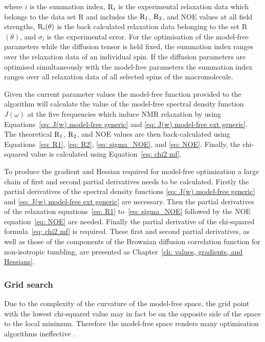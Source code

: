 \noindent where $i$ is the summation index, $\mathrm{R}_i$ is the experimental relaxation data which belongs to the data set R and includes the $\mathrm{R}_1$, $\mathrm{R}_2$, and NOE values at all field strengths, $\mathrm{R}_i(\theta)$ is the back calculated relaxation data belonging to the set R$(\theta)$, and $\sigma_i$ is the experimental error.
For the optimisation of the model-free parameters while the diffusion tensor is held fixed, the summation index ranges over the relaxation data of an individual spin.
If the diffusion parameters are optimised simultaneously with the model-free parameters the summation index ranges over all relaxation data of all selected spins of the macromolecule.

Given the current parameter values the model-free function provided to the algorithm will calculate the value of the model-free spectral density function $J(\omega)$ at the five frequencies which induce NMR relaxation by using Equations~\eqref{eq: J(w) model-free generic} and \eqref{eq: J(w) model-free ext generic}.
The theoretical $\mathrm{R}_1$, $\mathrm{R}_2$, and NOE values are then back-calculated using Equations~\eqref{eq: R1}, \eqref{eq: R2}, \eqref{eq: sigma_NOE}, and \eqref{eq: NOE}.
Finally, the chi-squared value is calculated using Equation~\eqref{eq: chi2 mf}.

To produce the gradient and Hessian required for model-free optimisation a large chain of first and second partial derivatives needs to be calculated.
Firstly the partial derivatives of the spectral density functions \eqref{eq: J(w) model-free generic} and \eqref{eq: J(w) model-free ext generic} are necessary.
Then the partial derivatives of the relaxation equations~\eqref{eq: R1} to~\eqref{eq: sigma_NOE} followed by the NOE equation~\eqref{eq: NOE} are needed.
Finally the partial derivative of the chi-squared formula~\eqref{eq: chi2 mf} is required.
These first and second partial derivatives, as well as those of the components of the Brownian diffusion correlation function for non-isotropic tumbling, are presented as Chapter~\ref{ch: values, gradients, and Hessians}.


\subsubsection{Grid search}

Due to the complexity of the curvature of the model-free space, the grid point with the lowest chi-squared value may in fact be on the opposite side of the space to the local minimum.
Therefore the model-free space renders many optimisation algorithms ineffective \citep{dAuvergneGooley08a}.


